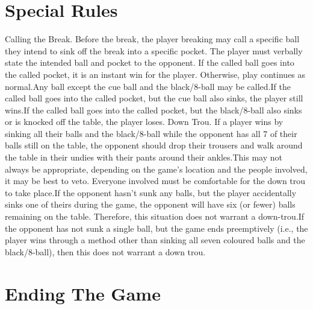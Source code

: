 \section{Special Rules} \label{8ball:special}

\label{8ball:callingthebreak} Calling the Break. Before the break, the player breaking may call a specific ball they intend to sink off the break into a specific pocket. The player must verbally state the intended ball and pocket to the opponent. If the called ball goes into the called pocket, it is an instant win for the player. Otherwise, play continues as normal.\standardspace Any ball except the cue ball and the black/8-ball may be called.\standardspace If the called ball goes into the called pocket, but the cue ball also sinks, the player still wins.\standardspace If the called ball goes into the called pocket, but the black/8-ball also sinks or is knocked off the table, the player loses.%
 Down Trou. If a player wins by sinking all their balls and the black/8-ball while the opponent has all 7 of their balls still on the table, the opponent should drop their trousers and walk around the table in their undies with their pants around their ankles.\standardspace This may not always be appropriate, depending on the game's location and the people involved, it may be best to veto. Everyone involved must be comfortable for the down trou to take place.\standardspace If the opponent hasn’t sunk any balls, but the player accidentally sinks one of theirs during the game, the opponent will have six (or fewer) balls remaining on the table. Therefore, this situation does not warrant a down-trou.\standardspace If the opponent has not sunk a single ball, but the game ends preemptively (i.e., the player wins through a method other than sinking all seven coloured balls and the black/8-ball), then this does not warrant a down trou.%

\section{Ending The Game} \label{8ball:ending}

